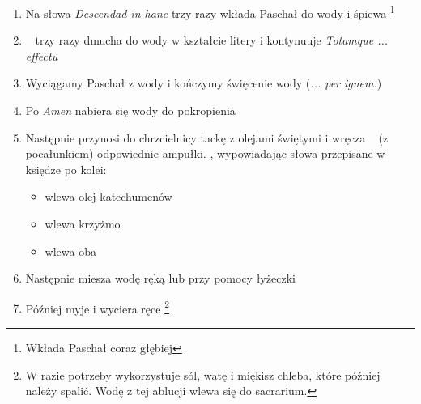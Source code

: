 \begin{enumerate}
      \item Na słowa \textit{Descendad in hanc} trzy razy wkłada Paschał do wody
            i śpiewa \footnote{Wkłada Paschał coraz głębiej}
      \item \ii~ trzy razy dmucha do wody w kształcie litery
            \textcolor{red}{\raisebox{-1mm}{\Large ${\Psi}$}} i kontynuuje
            \textit{Totamque ... effectu}
      \item Wyciągamy Paschał z wody i kończymy święcenie wody (\textit{... per
                  ignem.})
      \item Po \textit{Amen} nabiera się wody do pokropienia
      \item Następnie  przynosi do chrzcielnicy tackę z olejami świętymi i
            wręcza \ii~ (z pocałunkiem) odpowiednie ampułki. \ii, wypowiadając
            słowa przepisane w księdze po kolei:
            \begin{itemize}
                  \item wlewa olej katechumenów
                  \item wlewa krzyżmo
                  \item wlewa oba
            \end{itemize}
      \item Następnie miesza wodę ręką lub przy pomocy łyżeczki
      \item Później myje i wyciera ręce \footnote{W razie potrzeby wykorzystuje
                  sól, watę i miękisz chleba, które później należy spalić. Wodę
                  z tej ablucji wlewa
                  się do sacrarium.}
\end{enumerate}

